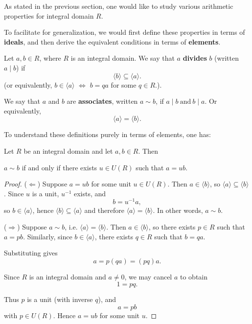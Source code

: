 As stated in the previous section, one would like to study various arithmetic properties for integral domain $R$. 

To facilitate for generalization, we would first define these properties in terms of {\bf ideals}, and then derive the equivalent conditions in terms of {\bf elements}.
\begin{definition}
Let $a,b \in R$, where $R$ is an integral domain.  
We say that $a$ \textbf{divides} $b$ (written $a \mid b$) if
\[
\langle b \rangle \subseteq \langle a \rangle.
\]
(or equivalently, \quad \( b \in \langle a \rangle\) \quad $\Leftrightarrow$ \quad  $b = qa$ for some $q \in R$.). 

We say that $a$ and $b$ are \textbf{associates}, written $a \sim b$, if \(a \mid b \ \text{and} \ b \mid a\). Or equivalently,
\[
\langle a \rangle = \langle b \rangle.
\]
\end{definition}
To understand these definitions purely in terms of elements, one has:
\begin{lemma}
Let $R$ be an integral domain and let $a,b \in R$. Then
\begin{center}
$a \sim b$
if and only if there exists $u \in U(R)$ such that $a = ub$.
\end{center}
\end{lemma}

\begin{proof}
($\Leftarrow$) Suppose $a = ub$ for some unit $u \in U(R)$.  
Then $a \in \langle b \rangle$, so $\langle a \rangle \subseteq \langle b \rangle$. Since $u$ is a unit, $u^{-1}$ exists, and
\[
b = u^{-1}a,
\]
so $b \in \langle a \rangle$, hence $\langle b \rangle \subseteq \langle a \rangle$ and therefore $\langle a \rangle = \langle b \rangle$. In other words, $a \sim b$.

\medskip

($\Rightarrow$) Suppose $a \sim b$, i.e. $\langle a \rangle = \langle b \rangle$. Then $a \in \langle b \rangle$, so there exists $p \in R$ such that
\(
a = pb.
\) Similarly, since $b \in \langle a \rangle$, there exists $q \in R$ such that
\(
b = qa.
\)

Substituting gives
\[
a = p(qa) = (pq)a.
\]

Since $R$ is an integral domain and $a \neq 0$, we may cancel $a$ to obtain
\[
1 = pq.
\]

Thus $p$ is a unit (with inverse $q$), and
\[
a = pb
\]
with $p \in U(R)$. Hence $a = ub$ for some unit $u$.
\end{proof}




